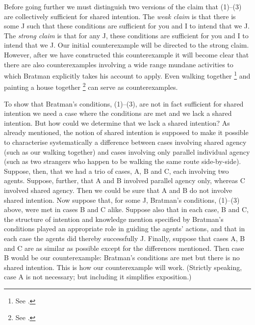 \documentclass[12pt,\papersize]{extarticle}
\begin{document}
Before going further we must distinguish two versions of the claim that (1)--(3) are collectively sufficient for shared intention.
The \emph{weak claim} is that there is some J such that these conditions are sufficient for you and I to intend that we J.
The \emph{strong claim\label{strong_claim}} is that for any J, these conditions are sufficient for you and I to intend that we J. 
Our initial counterexample will be directed to the strong claim.
However, after we have constructed this counterexample it will become clear that there are also counterexamples involving a wide range mundane activities to which Bratman explicitly takes his account to apply.
Even walking together%
	\footnote{
	See \citet[p.\ 150]{Bratman:2009lv}.
	}
and painting a house together%
	\footnote{
	See \citet[p.\ 331]{Bratman:1992mi}.
	}
can serve as counterexamples.
 



To show that  Bratman's conditions, (1)--(3), are not in fact sufficient for shared intention we need 
a case where the conditions are met and we lack a shared intention.
But how could we determine that we lack a shared intention?
As already mentioned, the notion of shared intention is supposed to 
	make it possible to 
	characterise systematically a difference between 
		cases involving shared agency (such as our walking together)
		and
		cases involving only parallel  individual agency (such as two strangers who happen to be walking the same route side-by-side). 
Suppose, then, that we had a trio of cases, A, B and C, each involving two agents.
Suppose, further, that A and B involved parallel agency only, whereas C involved shared agency.
Then we could be sure that A and B do not involve shared intention.
Now suppose 
	that, for some J, Bratman's conditions, (1)--(3) above, were met in cases B and C alike.
Suppose also that in each case, B and C, the structure of intention and knowledge mention specified by Bratman's conditions 
 played an appropriate role in guiding the agents' actions,
	and that in each case the agents did thereby  successfully J.
Finally, suppose that cases A, B and C are as similar as possible except for the differences mentioned.
Then case B would be our counterexample:
Bratman's conditions are met but there is no shared intention.
This is how our counterexample will work.
(Strictly speaking, case A is not necessary; but including it simplifies exposition.)
\end{document}
